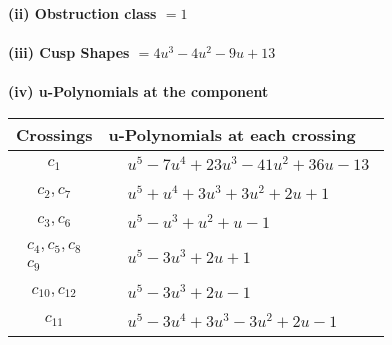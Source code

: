 \documentclass[1p]{elsarticle_modified}
\theoremstyle{definition}
\begin{document}
\flushleft \textbf{(ii) Obstruction class $= 1$}\\~\\
\flushleft \textbf{(iii) Cusp Shapes $= 4 u^3-4 u^2-9 u+13$}\\~\\
\newpage\renewcommand{\arraystretch}{1}
\flushleft \textbf{(iv) u-Polynomials at the component}\newline \\
\begin{tabular}{m{50pt}|m{274pt}}
Crossings & \hspace{64pt}u-Polynomials at each crossing \\
\hline $$\begin{aligned}c_{1}\end{aligned}$$&$\begin{aligned}
&u^5-7 u^4+23 u^3-41 u^2+36 u-13
\end{aligned}$\\
\hline $$\begin{aligned}c_{2},c_{7}\end{aligned}$$&$\begin{aligned}
&u^5+u^4+3 u^3+3 u^2+2 u+1
\end{aligned}$\\
\hline $$\begin{aligned}c_{3},c_{6}\end{aligned}$$&$\begin{aligned}
&u^5- u^3+u^2+u-1
\end{aligned}$\\
\hline $$\begin{aligned}c_{4},c_{5},c_{8}\\c_{9}\end{aligned}$$&$\begin{aligned}
&u^5-3 u^3+2 u+1
\end{aligned}$\\
\hline $$\begin{aligned}c_{10},c_{12}\end{aligned}$$&$\begin{aligned}
&u^5-3 u^3+2 u-1
\end{aligned}$\\
\hline $$\begin{aligned}c_{11}\end{aligned}$$&$\begin{aligned}
&u^5-3 u^4+3 u^3-3 u^2+2 u-1
\end{aligned}$\\
\hline
\end{tabular}\\~\\
\end{document}
